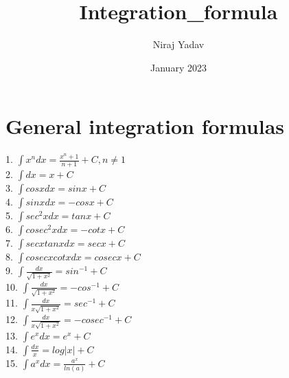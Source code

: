 \documentclass[22pt]{article}
\title{Integration_formula}
\author{Niraj Yadav}
\date{January 2023}
\begin{document}
\maketitle

\section{General integration formulas}

1. $\int x^n dx = \frac{x^ n +1}{n + 1} +C , n \not= 1 $ \\
2. $\int dx = x+ C$\\
3. $\int cos x dx = sin x + C$\\
4. $\int sin x dx = - cos x + C$\\
5. $\int sec ^2 x dx = tan x + C$ \\
6. $\int cosec ^2 x dx = - cot x + C$ \\
7. $\int sec x tan x dx = sec x + C$ \\
8. $\int cosec x cot x dx = cosec x + C$ \\
9. $\int \frac{dx}{\sqrt{1+x^2}} = sin^{-1} +C$\\
10. $\int \frac{dx}{\sqrt{1+x^2}} = - cos^{-1} +C$\\
11. $\int \frac{dx}{x\sqrt{1+x^2}} = sec^{-1} +C$\\
12. $\int \frac{dx}{x\sqrt{1+x^2}} = -cosec^{-1} +C$\\
13. $\int e^x dx = e^x + C$\\
14. $\int \frac{dx}{x} = log |x| + C$\\
15. $\int a^x dx = \frac{a^x}{ln (a)}+C$\\
\end{document}
